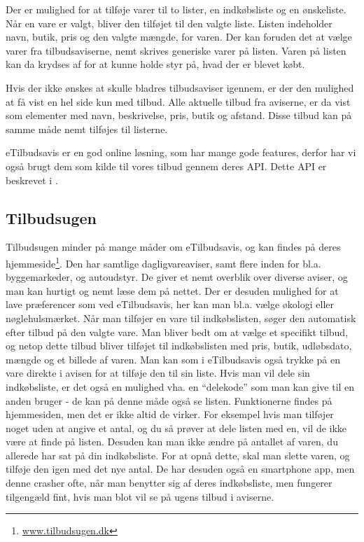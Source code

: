 Der er mulighed for at tilføje varer til to lister, en indkøbsliste og en ønskeliste.
Når en vare er valgt, bliver den tilføjet til den valgte liste.
Listen indeholder navn, butik, pris og den valgte mængde, for varen.
Der kan foruden det at vælge varer fra tilbudsaviserne, nemt skrives generiske varer på listen. Varen på listen kan da krydses af for at kunne holde styr på, hvad der er blevet købt.

Hvis der ikke ønskes at skulle bladres tilbudsaviser igennem, er der den mulighed at få vist en hel side kun med tilbud.
Alle aktuelle tilbud fra aviserne, er da vist som elementer med navn, beskrivelse, pris, butik og afstand. Disse tilbud kan på samme måde nemt tilføjes til listerne.

eTilbudsavis er en god online løsning, som har mange gode features, derfor har vi også brugt dem som kilde til vores tilbud gennem deres API.
Dette API er beskrevet i .

\subsection{Tilbudsugen}
Tilbudsugen minder på mange måder om eTilbudsavis, og kan findes på deres hjemmeside\footnote{\underline{www.tilbudsugen.dk}}.
Den har samtlige dagligvareaviser, samt flere inden for bl.a. byggemarkeder, og autoudstyr.
De giver et nemt overblik over diverse aviser, og man kan hurtigt og nemt læse dem på nettet.
Der er desuden mulighed for at lave præferencer som ved eTilbudsavis, her kan man bl.a. vælge økologi eller nøglehulsmærket.
Når man tilføjer en vare til indkøbslisten, søger den automatisk efter tilbud på den valgte vare.
Man bliver bedt om at vælge et specifikt tilbud, og netop dette tilbud bliver tilføjet til indkøbslisten med pris, butik, udløbsdato, mængde og et billede af varen.
Man kan som i eTilbudsavis også trykke på en vare direkte i avisen for at tilføje den til sin liste.
Hvis man vil dele sin indkøbsliste, er det også en mulighed vha. en ``delekode'' som man kan give til en anden bruger - de kan på denne måde også se listen.
Funktionerne findes på hjemmesiden, men det er ikke altid de virker.
For eksempel hvis man tilføjer noget uden at angive et antal, og du så prøver at dele listen med en, vil de ikke være at finde på listen.
Desuden kan man ikke ændre på antallet af varen, du allerede har sat på din indkøbsliste.
For at opnå dette, skal man slette varen, og tilføje den igen med det nye antal.
De har desuden også en smartphone app, men denne crasher ofte, når man benytter sig af deres indkøbsliste, men fungerer tilgengæld fint, hvis man blot vil se på ugens tilbud i aviserne.

